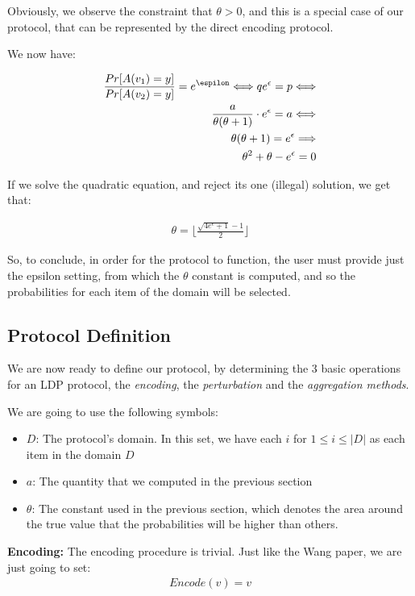 Obviously, we observe the constraint that $\theta > 0$, and this is a special case of our protocol, that can be represented by the direct encoding protocol.

We now have:

\begin{align*}
    \frac{Pr[A(v_1) = y]}{Pr[A(v_2) = y]} = e^{\espilon} \Longleftrightarrow 
    q e^{\epsilon} = p \Longleftrightarrow \\
    \frac{a}{\theta(\theta + 1)} \cdot e^{\epsilon} =  a \Longleftrightarrow \\
    \theta(\theta + 1) = e^{\epsilon} \Longrightarrow \\
    \theta^2 + \theta - e^\epsilon = 0
\end{align*}

If we solve the quadratic equation, and reject its one (illegal) solution, we get that:

\begin{align}
    \theta = \lfloor \frac{\sqrt{4e^{\epsilon} + 1} - 1}{2}\rfloor
\end{align}

So, to conclude, in order for the protocol to function, the user must provide just the epsilon setting, from which the $\theta$ constant is computed, and so the probabilities for each item of the domain will be selected.  


\subsection{Protocol Definition}

We are now ready to define our protocol, by determining the 3 basic operations for an LDP protocol, the \emph{encoding}, the \emph{perturbation} and the \emph{aggregation methods}.


We are going to use the following symbols:
\begin{itemize}
    \item $D$: The protocol's domain. In this set, we have each $i$ for $1 \leq i \leq |D|$ as each item in the domain $D$
    \item $a$: The quantity that we computed in the previous section
    \item $\theta$: The constant used in the previous section, which denotes the area around the true value that the probabilities will be higher than others.
    
\end{itemize}

\textbf{Encoding:} The encoding procedure is trivial. Just like the Wang paper, we are just going to set:
\begin{align*}
    Encode(v) = v
\end{align*}

